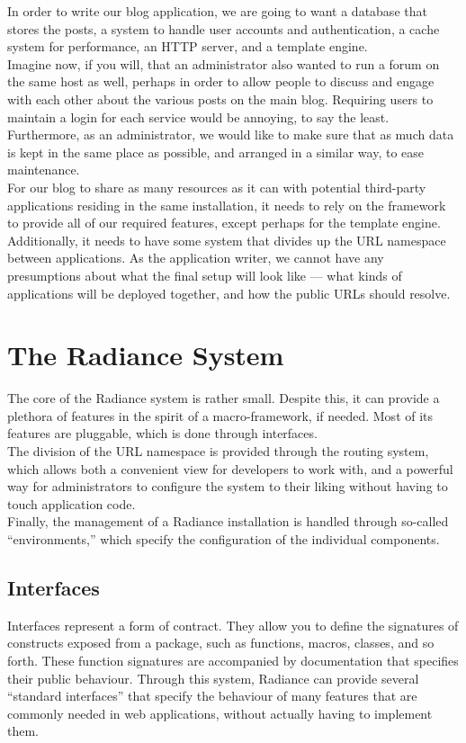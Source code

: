 \documentclass{sig-alternate}
\begin{document}
In order to write our blog application, we are going to want a database that stores the posts, a system to handle user accounts and authentication, a cache system for performance, an HTTP server, and a template engine. \\

Imagine now, if you will, that an administrator also wanted to run a forum on the same host as well, perhaps in order to allow people to discuss and engage with each other about the various posts on the main blog. Requiring users to maintain a login for each service would be annoying, to say the least. Furthermore, as an administrator, we would like to make sure that as much data is kept in the same place as possible, and arranged in a similar way, to ease maintenance. \\

For our blog to share as many resources as it can with potential third-party applications residing in the same installation, it needs to rely on the framework to provide all of our required features, except perhaps for the template engine. Additionally, it needs to have some system that divides up the URL namespace between applications. As the application writer, we cannot have any presumptions about what the final setup will look like --- what kinds of applications will be deployed together, and how the public URLs should resolve. \\

\section{The Radiance System}
The core of the Radiance system is rather small. Despite this, it can provide a plethora of features in the spirit of a macro-framework, if needed. Most of its features are pluggable, which is done through interfaces. \\

The division of the URL namespace is provided through the routing system, which allows both a convenient view for developers to work with, and a powerful way for administrators to configure the system to their liking without having to touch application code. \\

Finally, the management of a Radiance installation is handled through so-called ``environments,'' which specify the configuration of the individual components.

\subsection{Interfaces}
Interfaces represent a form of contract. They allow you to define the signatures of constructs exposed from a package, such as functions, macros, classes, and so forth. These function signatures are accompanied by documentation that specifies their public behaviour. Through this system, Radiance can provide several ``standard interfaces'' that specify the behaviour of many features that are commonly needed in web applications, without actually having to implement them. \\
\end{document}
